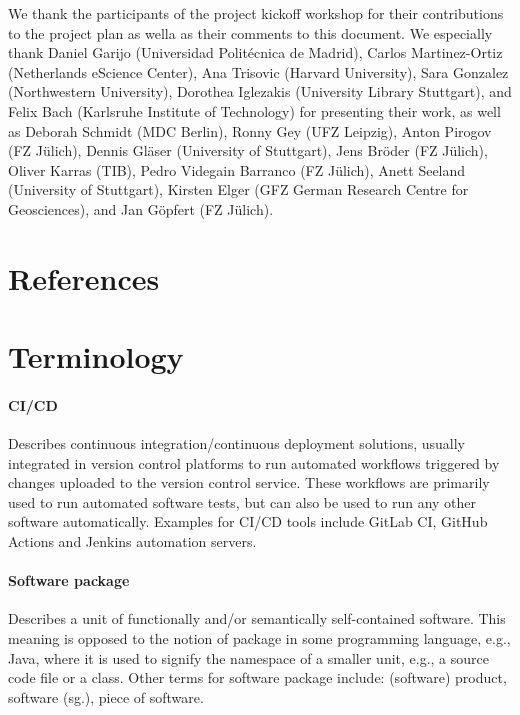 \documentclass{article}
\begin{document}
We thank the participants of the project kickoff workshop for their contributions to the project plan as wella as their comments to this document. We especially thank Daniel Garijo (Universidad Politécnica de Madrid), Carlos Martinez-Ortiz (Netherlands eScience Center), Ana Trisovic (Harvard University), Sara Gonzalez (Northwestern University), Dorothea Iglezakis (University Library Stuttgart), and Felix Bach (Karlsruhe Institute of Technology) for presenting their work, as well as Deborah Schmidt (MDC Berlin), Ronny Gey (UFZ Leipzig), Anton Pirogov (FZ Jülich), Dennis Gläser (University of Stuttgart), Jens Bröder (FZ Jülich), Oliver Karras (TIB), Pedro Videgain Barranco (FZ Jülich), Anett Seeland (University of Stuttgart), Kirsten Elger (GFZ German Research Centre for Geosciences), and Jan Göpfert (FZ Jülich).



\section{References}\label{yn9p9iv7jdw}




\section{Terminology}\label{urp18u0}


\paragraph{CI/CD}\label{qo8o3ddicwv8}
Describes continuous integration/continuous deployment solutions, usually integrated in version control platforms to run automated workflows triggered by changes uploaded to the version control service. These workflows are primarily used to run automated software tests, but can also be used to run any other software automatically. Examples for CI/CD tools include GitLab CI, GitHub Actions and Jenkins automation servers.



\paragraph{Software package}\label{ryblo0s6xdu}
Describes a unit of functionally and/or semantically self-contained software. This meaning is opposed to the notion of package in some programming language, e.g., Java, where it is used to signify the namespace of a smaller unit, e.g., a source code file or a class. Other terms for software package include: (software) product, software (sg.), piece of software.
\end{document}
